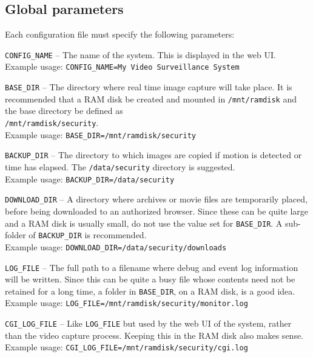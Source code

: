   \subsection{Global parameters}

    Each configuration file must specify the following parameters:

    \BI
    \I \texttt{CONFIG\_NAME} -- The name of the system.  This is displayed
       in the web UI.\\
       Example usage: \texttt{CONFIG\_NAME=My Video Surveillance System}

    \I \texttt{BASE\_DIR} -- The directory where real time image capture
       will take place.  It is recommended that a RAM disk be created
       and mounted in \texttt{/mnt/ramdisk} and the base directory be
       defined as\\
       \texttt{/mnt/ramdisk/security}. \\
       Example usage: \texttt{BASE\_DIR=/mnt/ramdisk/security}

    \I \texttt{BACKUP\_DIR} -- The directory to which images are copied
       if motion is detected or time has elapsed.  The \texttt{/data/security}
       directory is suggested.\\
       Example usage: \texttt{BACKUP\_DIR=/data/security}

    \I \texttt{DOWNLOAD\_DIR} -- A directory where archives or movie files
       are temporarily placed, before being downloaded to an authorized
       browser.  Since these can be quite large and a RAM disk is usually
       small, do not use the value set for \texttt{BASE\_DIR}.  A
       sub-folder of \texttt{BACKUP\_DIR} is recommended.\\
       Example usage: \texttt{DOWNLOAD\_DIR=/data/security/downloads}

    \I \texttt{LOG\_FILE} -- The full path to a filename where debug
       and event log information will be written.  Since this can be quite
       a busy file whose contents need not be retained for a long time,
       a folder in \texttt{BASE\_DIR}, on a RAM disk, is a good idea.\\
       Example usage: \texttt{LOG\_FILE=/mnt/ramdisk/security/monitor.log}

    \I \texttt{CGI\_LOG\_FILE} -- Like \texttt{LOG\_FILE} but used by
       the web UI of the system, rather than the video capture process.
       Keeping this in the RAM disk also makes sense.\\
       Example usage: \texttt{CGI\_LOG\_FILE=/mnt/ramdisk/security/cgi.log}
    \EI

